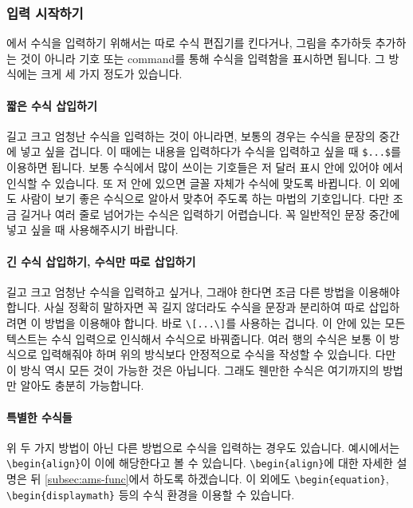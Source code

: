 \subsubsection{입력 시작하기}
\label{subsec:ams-start}
\lt 에서 수식을 입력하기 위해서는 따로 수식 편집기를 킨다거나, 그림을 추가하듯 추가하는 것이 아니라 기호 또는 command를 통해 수식을 입력함을 표시하면 됩니다.
그 방식에는 크게 세 가지 정도가 있습니다.

\paragraph{짧은 수식 삽입하기}
길고 크고 엄청난 수식을 입력하는 것이 아니라면, 보통의 경우는 수식을 문장의 중간에 넣고 싶을 겁니다.
이 때에는 내용을 입력하다가 수식을 입력하고 싶을 때 \verb|$...$|를 이용하면 됩니다.
보통 수식에서 많이 쓰이는 기호들은 저 달러 표시 안에 있어야 \lt 에서 인식할 수 있습니다.
또 저 안에 있으면 글꼴 자체가 수식에 맞도록 바뀝니다.
이 외에도 사람이 보기 좋은 수식으로 알아서 맞추어 주도록 하는 마법의 기호입니다.
다만 조금 길거나 여러 줄로 넘어가는 수식은 입력하기 어렵습니다.
꼭 일반적인 문장 중간에 넣고 싶을 때 사용해주시기 바랍니다.

\paragraph{긴 수식 삽입하기, 수식만 따로 삽입하기}
길고 크고 엄청난 수식을 입력하고 싶거나, 그래야 한다면 조금 다른 방법을 이용해야 합니다.
사실 정확히 말하자면 꼭 길지 않더라도 수식을 문장과 분리하여 따로 삽입하려면 이 방법을 이용해야 합니다.
바로 \verb|\[...\]|를 사용하는 겁니다.
이 안에 있는 모든 텍스트는 수식 입력으로 인식해서 수식으로 바꿔줍니다.
여러 행의 수식은 보통 이 방식으로 입력해줘야 하며 위의 방식보다 안정적으로 수식을 작성할 수 있습니다.
다만 이 방식 역시 모든 것이 가능한 것은 아닙니다.
그래도 웬만한 수식은 여기까지의 방법만 알아도 충분히 가능합니다.

\paragraph{특별한 수식들}
위 두 가지 방법이 아닌 다른 방법으로 수식을 입력하는 경우도 있습니다.
예시에서는 \verb|\begin{align}|이 이에 해당한다고 볼 수 있습니다.
\verb|\begin{align}|에 대한 자세한 설명은 뒤 \ref{subsec:ams-func}에서 하도록 하겠습니다.
이 외에도 \verb|\begin{equation}|, \verb|\begin{displaymath}| 등의 수식 환경을 이용할 수 있습니다.

